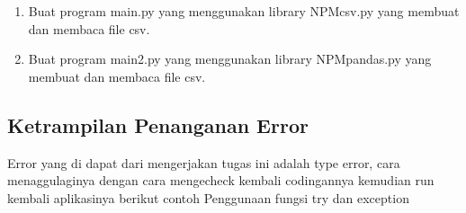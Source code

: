 \begin{enumerate}
	
	
	\item Buat program main.py yang menggunakan library NPMcsv.py yang membuat dan membaca file csv.
	
	
	
	\item Buat program main2.py yang menggunakan library NPMpandas.py yang membuat dan membaca file csv.
	
	
	
\end{enumerate}

\subsection{Ketrampilan Penanganan Error}
Error yang di dapat dari mengerjakan tugas ini adalah type error, cara menaggulaginya dengan cara mengecheck kembali codingannya
kemudian run kembali aplikasinya
berikut contoh Penggunaan fungsi try dan exception


